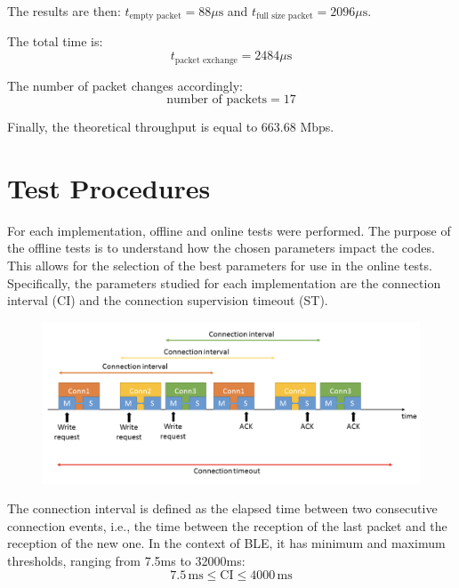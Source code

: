 \documentclass{Configuration_Files/PoliMi3i_thesis}
\begin{document}
The results are then: $t_{\text{empty packet}} = 88 \mu \text{s}$ and $t_{\text{full size packet}} = 2096 \mu \text{s}$.

The total time is:
\begin{equation}
t_{\text{packet exchange}} = 2484 \mu \text{s}
\label{eq:packet_exchange_case3}
\end{equation}

The number of packet changes accordingly:
\begin{equation}
\text{number of packets} = 17
\label{eq:number_of_packets_case3}
\end{equation}

Finally, the theoretical throughput is equal to 663.68 Mbps.

\section{Test Procedures}
For each implementation, offline and online tests were performed. The purpose of the offline tests is to understand how the chosen parameters impact the codes. This allows for the selection of the best parameters for use in the online tests. Specifically, the parameters studied for each implementation are the connection interval (CI) and the connection supervision timeout (ST).

\begin{figure}[H]
    \centering
    \includegraphics[scale=0.3]{Test_Procedure/1.png}
    \label{fig:connection_interval_timeout}
\end{figure}

The connection interval is defined as the elapsed time between two consecutive connection events, i.e., the time between the reception of the last packet and the reception of the new one. In the context of BLE, it has minimum and maximum thresholds, ranging from 7.5ms to 32000ms:
\[
7.5\,\text{ms} \leq \text{CI} \leq 4000\,\text{ms}
\]
\end{document}
